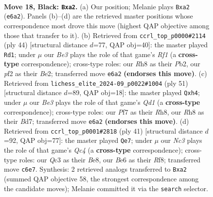 \documentclass[11pt]{article}
\begin{document}
\clearpage

\begin{figure}[p]\centering
\begin{subfigure}{0.46\textwidth}\centering
\resizebox{\linewidth}{!}{%
\newchessgame
\chessboard[
  setfen={r6r/ppk2p1p/2n1bN2/4N1Q1/3p4/2qP4/P4PPP/5RK1 b - - 0 18},
  showmover=false,
  pgfstyle=straightmove, color=movearrow, markmove={e6-a2}
]}
\caption{}
\end{subfigure}\hfill
\begin{subfigure}{0.46\textwidth}\centering
\resizebox{\linewidth}{!}{%
\newchessgame
\chessboard[
  setfen={nq3rk1/5p1p/2Qp2p1/3P4/2Npn3/8/1P2BPPP/5RK1 w - - 2 23},
  showmover=false,
  pgfstyle=straightmove, color=movearrow, markmove={f1-d1}
]}
\caption{}
\end{subfigure}
\\[4pt]
\begin{subfigure}{0.46\textwidth}\centering
\resizebox{\linewidth}{!}{%
\newchessgame
\chessboard[
  setfen={3q3r/3b2k1/4p1p1/p1rpP2n/1p1N2NP/8/PPPQ4/2K2RR1 b - - 1 26},
  showmover=false,
  pgfstyle=straightmove, color=movearrow, markmove={d8-h4}
]}
\caption{}
\end{subfigure}\hfill
\begin{subfigure}{0.46\textwidth}\centering
\resizebox{\linewidth}{!}{%
\newchessgame
\chessboard[
  setfen={2k1br2/1ppn1pp1/p3p3/2q1N3/2P2P2/8/PPBQ2PP/1K1R4 b - - 2 21},
  showmover=false,
  pgfstyle=straightmove, color=movearrow, markmove={c5-e7}
]}
\caption{}
\end{subfigure}
\caption{\textbf{Move 18, Black: \texttt{Bxa2}.} (a) Our position; Melanie plays \texttt{Bxa2} (\texttt{e6a2}). Panels (b)--(d) are the retrieved master positions whose correspondence most drove this move (highest QAP objective among those that transfer to it). (b) Retrieved from \texttt{ccrl\_top\_p0000\#2114} (ply 44) [structural distance $d$=77, QAP obj=40]: the master played \texttt{Rd1}; under $\mu$ our \emph{Be3} plays the role of that game's \emph{Rf1} (a \textbf{cross-type} correspondence); cross-type roles: our \emph{R}h8 as their \emph{P}b2, our \emph{p}f2 as their \emph{B}e2; transferred move \texttt{e6a2} \textbf{(endorses this move)}. (c) Retrieved from \texttt{lichess\_elite\_2024-09\_p0022\#1004} (ply 51) [structural distance $d$=89, QAP obj=18]: the master played \texttt{Qxh4}; under $\mu$ our \emph{Be3} plays the role of that game's \emph{Qd1} (a \textbf{cross-type} correspondence); cross-type roles: our \emph{P}f7 as their \emph{R}h8, our \emph{R}h8 as their \emph{B}d7; transferred move \texttt{e6a2} \textbf{(endorses this move)}. (d) Retrieved from \texttt{ccrl\_top\_p0001\#2818} (ply 41) [structural distance $d$=92, QAP obj=77]: the master played \texttt{Qe7}; under $\mu$ our \emph{Nc3} plays the role of that game's \emph{Qc4} (a \textbf{cross-type} correspondence); cross-type roles: our \emph{Q}c3 as their \emph{B}e8, our \emph{B}e6 as their \emph{R}f8; transferred move \texttt{c6e7}. Synthesis: 2 retrieved analogs transferred to \texttt{Bxa2} (summed QAP objective 58, the strongest correspondence among the candidate moves); Melanie committed it via the \texttt{search} selector.}
\label{fig:thought-m35}
\end{figure}
\end{document}
